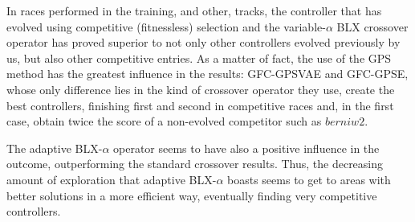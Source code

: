 \documentclass[10pt,journal,compsoc]{IEEEtran}
\begin{document}


In races performed in the training, and other, tracks, the controller
that has evolved using competitive (fitnessless) selection and the
variable-$\alpha$ BLX crossover operator has proved superior to not
only other controllers evolved previously by us, but also other
competitive entries. As a matter of fact, the use of the GPS method has the greatest 
influence in the results: {\sf GFC-GPSVAE} and {\sf GFC-GPSE}, whose only
difference lies in the kind of crossover operator they use, create the
best controllers, finishing first and second in competitive races and,
in the first case, obtain twice the score of a non-evolved
competitor such as $berniw2$.

The adaptive BLX-$\alpha$ operator seems to have also a positive
influence in the outcome, outperforming the standard crossover
results. Thus, the decreasing amount of exploration that adaptive
BLX-$\alpha$ boasts seems to get to areas with better solutions in a
more efficient way, eventually finding very competitive controllers.
\end{document}
